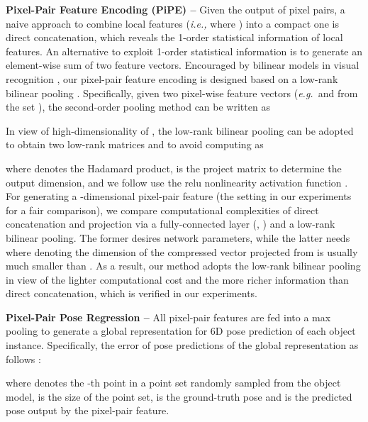 \documentclass[letterpaper, 10 pt, conference]{ieeeconf}
\def\eg{\emph{e.g.~}} \def\Eg{\emph{E.g.}~}
\begin{document}
\vspace{0.1cm}\noindent\textbf{Pixel-Pair Feature Encoding (PiPE) --}
Given the output of pixel pairs, a naive approach to combine local features (\textit{i.e.,}  where ) into a compact one is direct concatenation, which reveals the 1-order statistical information of local features. 
An alternative to exploit 1-order statistical information is to generate an element-wise sum of two feature vectors.
Encouraged by bilinear models in visual recognition \cite{kar2012random,pham2013fast,wei2018grassmann}, 
our pixel-pair feature encoding is designed based on a low-rank bilinear pooling \cite{kim2016hadamard}.
Specifically, given two pixel-wise feature vectors (\eg  and  from the set ), the second-order pooling method \cite{carreira2012semantic} can be written as 

In view of high-dimensionality  of , the low-rank bilinear pooling \cite{kim2016hadamard} can be adopted to obtain two low-rank matrices  and  to avoid computing  as

where  denotes the Hadamard product,  is the project matrix to determine the output dimension, and we follow \cite{kim2016hadamard} use the relu nonlinearity activation function .
For generating a -dimensional pixel-pair feature (the setting in our experiments for a fair comparison), we compare computational complexities of direct concatenation and projection via a fully-connected layer (, ) and a low-rank bilinear pooling.
The former desires  network parameters, while the latter needs  where  denoting the dimension of the compressed vector projected from  is usually much smaller than . 
As a result, our method adopts the low-rank bilinear pooling in view of the lighter computational cost and the more richer information than direct concatenation, which is verified in our experiments.


\vspace{0.1cm}\noindent\textbf{Pixel-Pair Pose Regression --}
All  pixel-pair features  are fed into a max pooling to generate a global representation for 6D pose prediction of each object instance.
Specifically, the error of pose predictions of the global representation as follows \cite{wang2019densefusion}:

where  denotes the -th point in a point set randomly sampled from the object model,  is the size of the point set,  is the ground-truth pose and  is the predicted pose output by the pixel-pair feature.
\end{document}
